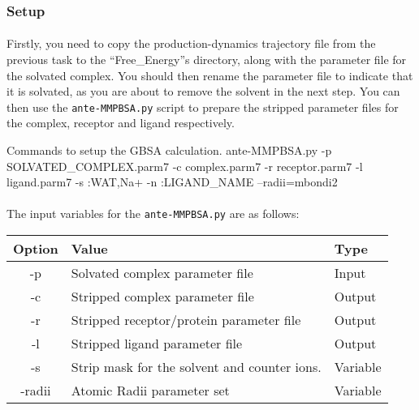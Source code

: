     \subsubsection{Setup}
    \paragraph{}
    Firstly, you need to copy the production-dynamics trajectory file from the previous task to the \enquote{Free\_Energy}s directory, along with the parameter file for the solvated complex. You should then rename the parameter file to indicate that it is solvated, as you are about to remove the solvent in the next step. You can then use the \texttt{ante-MMPBSA.py} script to prepare the stripped parameter files for the complex, receptor and ligand respectively. 
    
    \begin{bashcmd}[label=listing:gbsa-init]{Commands to setup the GBSA calculation.}
    ante-MMPBSA.py -p SOLVATED_COMPLEX.parm7 -c complex.parm7 -r receptor.parm7 -l ligand.parm7 -s :WAT,Na+ -n :LIGAND_NAME --radii=mbondi2
    \end{bashcmd}

    \paragraph{}
    The input variables for the \texttt{ante-MMPBSA.py} are as follows:

\begin{table}[H]
\centering
\begin{tabular}{@{}cll@{}}
\toprule
\multicolumn{1}{l}{\textbf{Option}} & \textbf{Value}    & \textbf{Type} \\ \midrule
-p      & Solvated complex parameter file               & Input         \\
-c      & Stripped complex parameter file               & Output        \\
-r      & Stripped receptor/protein parameter file      & Output        \\
-l      & Stripped ligand parameter file                & Output        \\
-s      & Strip mask for the solvent and counter ions.  & Variable      \\
-radii  & Atomic Radii parameter set                    & Variable      \\ 
\bottomrule
\end{tabular}
\end{table}

